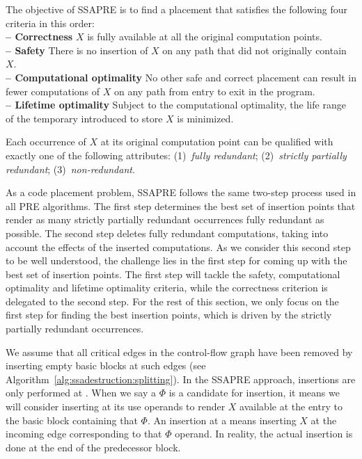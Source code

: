 The objective of SSAPRE is to find a placement that satisfies the following four criteria in this order:\\
\textbf{-- Correctness} $X$ is fully available at all the original computation points.\\
\textbf{-- Safety} There is no insertion of $X$ on any path that did not originally contain $X$.\\
\textbf{-- Computational optimality} No other safe and correct placement can result in fewer computations of $X$ on any path from entry to exit in the program.\\
\textbf{-- Lifetime optimality} Subject to the computational optimality, the life range of the temporary introduced to store $X$ is minimized.

Each occurrence of $X$ at its original computation point can be qualified
with exactly one of the following attributes:
(1)~\emph{fully redundant};
(2)~\emph{strictly partially redundant};
(3)~\emph{non-redundant}.

As a code placement problem, SSAPRE follows the same two-step process used in all PRE algorithms. 
The first step determines the best set of insertion points that render as many strictly partially redundant occurrences fully redundant as possible. 
The second step deletes fully redundant computations, taking into account the effects of the inserted computations. 
As we consider this second step to be well understood, the challenge lies in the first step for coming up with the best set of insertion points. 
The first step will tackle the safety, computational optimality and lifetime optimality criteria, while the correctness criterion is delegated to the second step. 
For the rest of this section, we only focus on the first step for finding the best insertion points, which is driven by the strictly partially redundant occurrences.

We assume that all critical edges in the control-flow graph have been removed by inserting empty basic blocks at such edges (see Algorithm~\ref{alg:ssadestruction:splitting}).
In the SSAPRE approach, insertions are only performed at \PHIuses.
When we say a $\Phi$ is a candidate for insertion, it means we will consider inserting at its use operands to render $X$ available at the entry to the basic block containing that $\Phi$. 
An insertion at a \PHIuse means inserting $X$ at the incoming edge corresponding to that $\Phi$ operand. 
In reality, the actual insertion is done at the end of the predecessor block.

